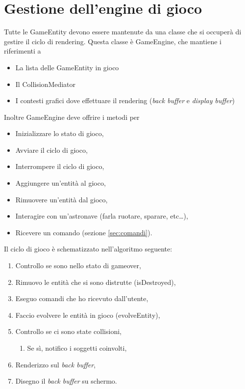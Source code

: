 \documentclass[a4paper,12pt]{article}
\begin{document}
\section{Gestione dell'engine di gioco}
\label{sec:engine}

Tutte le \textsf{GameEntity} devono essere mantenute da una classe che si occuper\`a di gestire il ciclo di rendering. Questa classe \`e \textsf{GameEngine}, che mantiene i riferimenti a

\begin{itemize}
\item La lista delle \textsf{GameEntity} in gioco
\item Il \textsf{CollisionMediator}
\item I contesti grafici dove effettuare il rendering (\emph{back buffer} e \emph{display buffer})
\end{itemize}

Inoltre \textsf{GameEngine} deve offrire i metodi per
\begin{itemize}
\item Inizializzare lo stato di gioco,
\item Avviare il ciclo di gioco,
\item Interrompere il ciclo di gioco,
\item Aggiungere un'entit\`a al gioco,
\item Rimuovere un'entit\`a dal gioco,
\item Interagire con un'astronave (farla ruotare, sparare, etc\dots{}),
\item Ricevere un comando (sezione \ref{sec:comandi}).
\end{itemize}

Il ciclo di gioco \`e schematizzato nell'algoritmo seguente:
\begin{enumerate}
\item Controllo se sono nello stato di gameover,
\item Rimuovo le entit\`a che si sono distrutte (\textsf{isDestroyed}),
\item Eseguo comandi che ho ricevuto dall'utente,
\item Faccio evolvere le entit\`a in gioco (\textsf{evolveEntity}),
\item Controllo se ci sono state collisioni,
\begin{enumerate}
\item Se s\`i, notifico i soggetti coinvolti,
\end{enumerate}
\item Renderizzo sul \emph{back buffer},
\item Disegno il \emph{back buffer} su schermo.
\end{enumerate}
\end{document}
